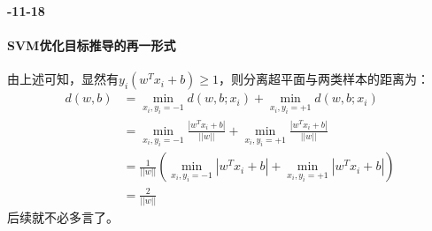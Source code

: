 \textbf{-11-18}\\
\paragraph{SVM优化目标推导的再一形式}
由上述可知，显然有$y_i ( w^T x_i + b ) \geq 1$，则分离超平面与两类样本的距离为：
\begin{align}
	d(w, b) &= \mathop{min}_{x_i, y_i=-1} d(w, b; x_i) + \mathop{min}_{x_i, y_i=+1} d(w, b; x_i) \nonumber \\
			&= 	\mathop{min}_{x_i, y_i=-1} \frac{|w^T x_i + b|}{||w||} + \mathop{min}_{x_i, y_i=+1} \frac{|w^T x_i + b|}{||w||} \nonumber \\
			&= \frac{1}{||w||} ( \mathop{min}_{x_i, y_i=-1} |w^T x_i + b| + \mathop{min}_{x_i, y_i=+1} |w^T x_i + b|) \nonumber \\
			&= \frac{2}{||w||}
\end{align}
后续就不必多言了。




